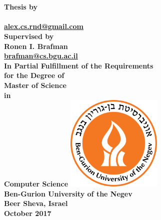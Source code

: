 

\frontmatter


\thispagestyle{empty}

\begingroup
\centering
{}
~
\\[1em]
\sffamily\bfseries\fontsize{26}{31.2}\selectfont
\DocumentTitle
\\[0.4in]
\normalfont\large
Thesis by
\\[0.25em]
\sffamily\bfseries\Large
\AuthorName
\\[0.15em]
\normalfont\normalsize
\href{mailto:alex.cs.rnd@gmail.com}{alex.cs.rnd@gmail.com}
\\[0.4in]
\normalfont\large
Supervised by
\\[0.25em]
\sffamily\bfseries\Large
Ronen I. Brafman
\\[0.15em]
\normalfont\normalsize
\href{mailto:brafman@cs.bgu.ac.il}{brafman@cs.bgu.ac.il}
\\[0.4in]
\normalfont\normalsize
In Partial Fulfillment of the Requirements
\\[0.5em]
for the Degree of
\\[0.5em]
Master of Science
\\[0.5em]
in
\\[0.5em]
Computer Science
\vfill
\includegraphics[height=1.8in, width=1.8in]
{bengurion.png}
\\[1.5em]
Ben-Gurion University of the Negev
\\[0.5em]
Beer Sheva, Israel
\\[1.5em]
October 2017
\par
\endgroup



\setcounter{page}{1}
\pagestyle{plain}
\cleardoublepage

